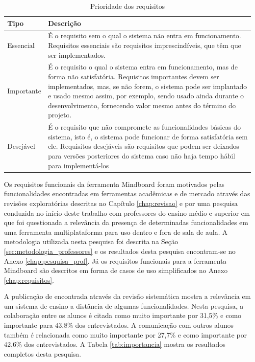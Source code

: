 \bgroup
\def\arraystretch{1.5} %
\begin{table}[h]{} %
\caption{Prioridade dos requisitos}
\centering
\begin{tabular}{ | p{3cm} | p{10cm}| } \hline
\textbf{Tipo} & \textbf{Descrição} \\ \hline
Essencial & É o requisito sem o qual o sistema não entra em funcionamento. Requisitos essenciais são requisitos imprescindíveis, que têm que ser implementados.  \\ \hline
Importante  & É o requisito o qual o sistema entra em funcionamento, mas de forma não satisfatória. Requisitos importantes devem ser implementados, mas, se não forem, o sistema pode ser implantado e usado mesmo assim, por exemplo, sendo usado ainda durante o desenvolvimento, fornecendo valor mesmo antes do término do projeto.  \\ \hline
Desejável  & É o requisito que não compromete as funcionalidades básicas do sistema, isto é, o sistema pode funcionar de forma satisfatória sem ele. Requisitos desejáveis são requisitos que podem ser deixados para versões posteriores do sistema caso não haja tempo hábil para implementá-los  \\ \hline
\end{tabular}
\label{tab:prioridade_req}
\end{table}
\egroup

Os requisitos funcionais da ferramenta Mindboard foram motivados pelas funcionalidades encontradas em ferramentas acadêmicas e de mercado através das revisões exploratórias descritas no Capítulo \ref{chap:revisao} e por uma pesquisa conduzida no início deste trabalho com professores do ensino médio e superior em que foi questionada a relevância da presença de determinadas funcionalidades em uma ferramenta multiplataforma para uso dentro e fora de sala de aula. A metodologia utilizada nesta pesquisa foi descrita na Seção \ref{sec:metodologia_professores} e os resultados desta pesquisa encontram-se no Anexo \ref{chap:pesquisa_prof}. Já os requisitos funcionais para a ferramenta Mindboard são descritos em forma de casos de uso simplificados no Anexo \ref{chap:requisitos}.

A publicação de   encontrada através da revisão sistemática mostra a relevância em um sistema de ensino a distância de algumas funcionalidades. Nesta pesquisa, a colaboração entre os alunos é citada como muito importante por 31,5\% e como importante para 43,8\% dos entrevistados. A comunicação com outros alunos também é relacionada como muito importante por 27,7\% e como importante por 42,6\% dos entrevistados. A Tabela \ref{tab:importancia} mostra os resultados completos desta pesquisa. 

